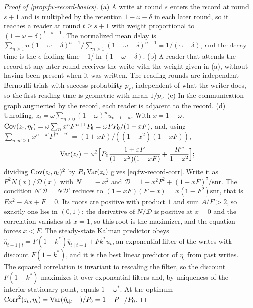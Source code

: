 \begin{proof}[Proof of \cref{prop:fw-record-basics}]
(a) A write at round $s$ enters the record at round $s+1$ and is multiplied by the retention $1-\omega-\delta$ in each later round, so it reaches a reader at round $t\ge s+1$ with weight proportional to $(1-\omega-\delta)^{t-s-1}$. The normalized mean delay is $\sum_{n\ge1}n(1-\omega-\delta)^{n-1}/\sum_{n\ge1}(1-\omega-\delta)^{n-1}=1/(\omega+\delta)$, and the decay time is the $e$-folding time $-1/\ln(1-\omega-\delta)$. (b) A reader that attends the record at any later round receives the write with the weight given in (a), without having been present when it was written. The reading rounds are independent Bernoulli trials with success probability $p_r$, independent of what the writer does, so the first reading time is geometric with mean $1/p_r$. (c) In the communication graph augmented by the record, each reader is adjacent to the record. (d) Unrolling, $z_t=\omega\sum_{n\ge0}(1-\omega)^nu_{t-1-n}$. With $x=1-\omega$, $\operatorname{Cov}(z_t,\eta_t)=\omega\sum_nx^nF^{n+1}P_0=\omega FP_0/(1-xF)$, and, using $\sum_{n,n'\ge0}x^{n+n'}F^{\lvert n-n'\rvert}=(1+xF)/((1-x^2)(1-xF))$,
\[
\operatorname{Var}(z_t)=\omega^2\Bigl[P_0\frac{1+xF}{(1-x^2)(1-xF)}+\frac{R^w}{1-x^2}\Bigr];
\]
dividing $\operatorname{Cov}(z_t,\eta_t)^2$ by $P_0\operatorname{Var}(z_t)$ gives \eqref{eq:fw-record-corr}. Write it as $F^2N(x)/\mathcal D(x)$ with $N=1-x^2$ and $\mathcal D=1-x^2F^2+(1-xF)^2/\mathrm{snr}$. The condition $N'\mathcal D=N\mathcal D'$ reduces to $(1-xF)(F-x)=x(1-F^2)\mathrm{snr}$, that is $Fx^2-Ax+F=0$. Its roots are positive with product $1$ and sum $A/F>2$, so exactly one lies in $(0,1)$; the derivative of $N/\mathcal D$ is positive at $x=0$ and the correlation vanishes at $x=1$, so this root is the maximizer, and the equation forces $x<F$. The steady-state Kalman predictor obeys $\hat\eta_{t+1\mid t}=F(1-k^\ast)\hat\eta_{t\mid t-1}+Fk^\ast u_t$, an exponential filter of the writes with discount $F(1-k^\ast)$, and it is the best linear predictor of $\eta_t$ from past writes. The squared correlation is invariant to rescaling the filter, so the discount $F(1-k^\ast)$ maximizes it over exponential filters and, by uniqueness of the interior stationary point, equals $1-\omega^\ast$. At the optimum $\operatorname{Corr}^2(z_t,\eta_t)=\operatorname{Var}(\hat\eta_{t\mid t-1})/P_0=1-P^-/P_0$.
\end{proof}

